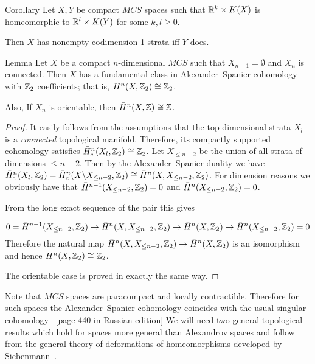 \begin{thm}{Corollary}
Let $X,Y$ be compact $MCS$ spaces such that $\RR^k\times K(X)$ is homeomorphic to $\RR^l\times K(Y)$ for some $k,l\ge 0$.

Then $X$ has nonempty codimension 1 strata iff $Y$ does.
\end{thm}
\begin{thm}{Lemma}\label{top-gr-pet}
Let $X$ be a  compact $n$-dimensional $MCS$ such that $X_{n-1}=\emptyset$ and $X_n$ is connected.
Then $X$ has a fundamental class in Alexander--Spanier cohomology with $\mathbb{Z}_2$ coefficients; that is, $\bar H^{n}(X,\mathbb{Z}_2)\cong \mathbb{Z}_2$. 

Also, If $X_n$ is orientable, then   $\bar H^{n}(X,\mathbb{Z})\cong \mathbb{Z}$. 
\end{thm}
\begin{proof}
It easily follows from the assumptions that the top-dimensional strata $X_l$ is a {\it connected} topological manifold. Therefore, its compactly supported cohomology satisfies $\bar H^n_c(X_l,\mathbb{Z}_2)\cong \mathbb{Z}_2$.
Let $X_{\le n-2}$ be the union of all strata of dimensions $\le n-2$. Then by the Alexander--Spanier duality we have $\bar H^n_c(X_l,\ZZ_2)=\bar H^n_c(X\backslash X_{\le n-2},\ZZ_2)\cong \bar H^n(X, X_{\le n-2},\ZZ_2)$. 
For dimension reasons we obviously have that $\bar H^{n-1}(X_{\le n-2},\ZZ_2)=0$ and $\bar H^{n}(X_{\le n-2},\ZZ_2)=0$.

From the long exact sequence of the pair this gives

\[
0=\bar H^{n-1}(X_{\le n-2},\ZZ_2)\to \bar H^n(X, X_{\le n-2},\ZZ_2)\to \bar H^n(X,\ZZ_2)\to \bar H^n(X_{\le n-2},\ZZ_2)=0
\]
Therefore the natural map $\bar H^n(X, X_{\le n-2},\ZZ_2)\to \bar H^n(X,\ZZ_2)$ is an isomorphism and hence $\bar H^{n}(X,\mathbb{Z}_2)\cong \mathbb{Z}_2$.

The orientable case is proved in exactly the same way.
\end{proof}

Note that $MCS$ spaces are paracompact and locally contractible. Therefore for such spaces  the Alexander--Spanier cohomology coincides with the usual singular cohomology ~\cite{Spanier}[page 440 in Russian edition]
We will need two general topological results which hold for spaces more general than  Alexandrov spaces and follow from the general theory of deformations of homeomorphisms developed by Siebenmann~\cite{Sieb}.

